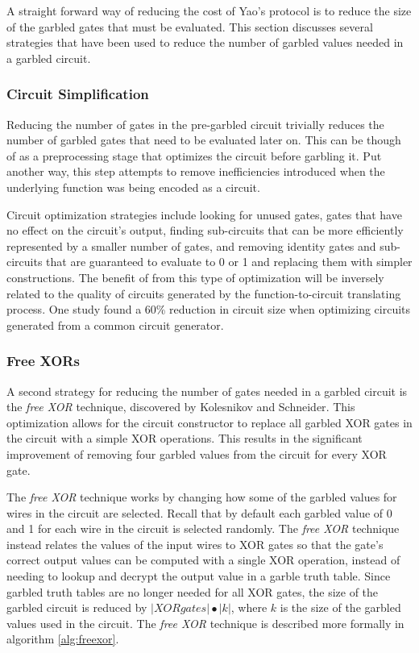 A straight forward way of reducing the cost of Yao's protocol is to reduce the size of the garbled gates that must be evaluated. This section discusses several strategies that have been used to reduce the number of garbled values needed in a garbled circuit.

\subsubsection{Circuit Simplification}

Reducing the number of gates in the pre-garbled circuit trivially reduces the number of garbled gates that need to be evaluated later on.  This can be though of as a preprocessing stage that optimizes the circuit before garbling it.  Put another way, this step attempts to remove inefficiencies introduced when the underlying function was being encoded as a circuit.

Circuit optimization strategies include looking for unused gates, gates that have no effect on the circuit's output, finding sub-circuits that can be more efficiently represented by a smaller number of gates, and removing identity gates and sub-circuits that are guaranteed to evaluate to 0 or 1 and replacing them with simpler constructions\cite{kreuter2012billion, pinkas2009secure}.  The benefit of from this type of optimization will be inversely related to the quality of circuits generated by the function-to-circuit translating process.  One study\cite{pinkas2009secure} found a 60\% reduction in circuit size when optimizing circuits generated from a common circuit generator\cite{malkhi2004fairplay}.


\subsubsection{Free XORs}
\label{sec:freexoropt}

A second strategy for reducing the number of gates needed in a garbled circuit is the \emph{free XOR} technique, discovered by Kolesnikov and Schneider\cite{kolesnikov2008improved}.  This optimization allows for the circuit constructor to replace all garbled XOR gates in the circuit with a simple XOR operations. This results in the significant improvement of removing four garbled values from the circuit for every XOR gate.

The \emph{free XOR} technique works by changing how some of the garbled values for wires in the circuit are selected. Recall that by default each garbled value of 0 and 1 for each wire in the circuit is selected randomly.  The \emph{free XOR} technique instead relates the values of the input wires to XOR gates so that the gate's correct output values can be computed with a single XOR operation, instead of needing to lookup and decrypt the output value in a garble truth table. Since garbled truth tables are no longer needed for all XOR gates, the size of the garbled circuit is reduced by $|XOR gates| \bullet |k|$, where $k$ is the size of the garbled values used in the circuit. The \emph{free XOR} technique is described more formally in algorithm \ref{alg:freexor}.

